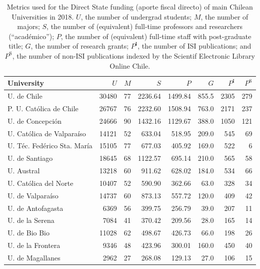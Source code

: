 \documentclass[twocolumn]{article}
\def\npup{\ensuremath{U}}
\def\nmaj{\ensuremath{M}}
\def\nprof{\ensuremath{S}}
\def\ngrad{\ensuremath{P}}
\def\ngrant{\ensuremath{G}}
\def\nisi{\ensuremath{P^\text{I}}}
\def\nscielo{\ensuremath{P^\text{S}}}
\begin{document}
\begin{table}
\caption{Metrics used for the Direct State funding (aporte fiscal directo) of
main Chilean Universities in 2018. \npup{}, the number of
undergrad students; \nmaj{}, the number of majors; \nprof{}, the number of
(equivalent) full-time professors and researchers (``académico''); \ngrad{},
the number of (equivalent) full-time staff with post-graduate title; \ngrant{},
the number of research grants; $\nisi$, the number of ISI publications; and
$\nscielo$, the number of non-ISI publications indexed by the Scientif
Electronic Library Online Chile.}
\label{tab:metrics}
\centering\footnotesize
\begin{tabular}{l rrrrrrr}
\hline
University                 & \npup  & \nmaj &\nprof  &\ngrad &\ngrant& \nisi&\nscielo\\
\hline\hline
U. de Chile               & 30480 	& 77 &   2236.64&1499.84&855.5  &  2305&	279  \\
P. U. Católica de Chile    & 26767 	& 76 &   2232.60&1508.94&763.0  &  2171&	237  \\
U. de Concepción           & 24666 	& 90 &   1432.16&1129.67&388.0  &  1050&	121  \\
U. Católica de Valparaíso  & 14121 	& 52 &    633.04& 518.95&209.0  &   545&	 69  \\
U. Téc. Fedérico Sta. María& 15105 	& 77 &    677.03& 405.92&169.0  &   522&	  6  \\
U. de Santiago             & 18645 	& 68 &   1122.57& 695.14&210.0  &   565&	 58  \\
U. Austral                 & 13218 	& 60 &    911.62& 628.02&184.0  &   534&	 66  \\
U. Católica del Norte      & 10407 	& 52 &    590.90& 362.66& 63.0  &   328&	 34  \\
U. de Valparaíso           & 14737 	& 60 &    873.13& 557.72&120.0  &   409&	 42  \\
U. de Antofagasta          &  6369 	& 56 &    399.75& 256.79& 39.0  &   207&	 11  \\
U. de la Serena            &  7084 	& 41 &    370.42& 209.56& 28.0  &   165&	 14  \\
U. de Bio Bio              & 11028 	& 62 &    498.67& 426.73& 66.0  &   198&	 26  \\
U. de la Frontera          &  9346 	& 48 &    423.96& 300.01&160.0  &   450&	 40  \\
U. de Magallanes           &  2962 	& 27 &    268.08& 129.13& 27.0  &   106&	 15  \\

\end{tabular}
\end{table}
\end{document}
